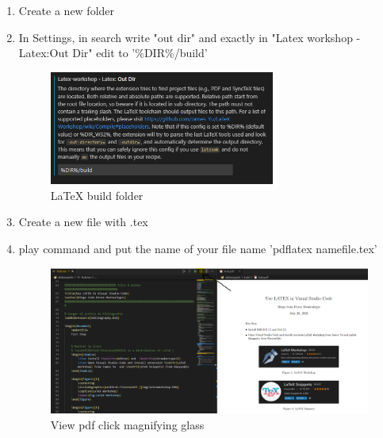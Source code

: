\documentclass{article}
\theoremstyle{mytheoremstyle}
\theoremstyle{mytheoremstyle}
\theoremstyle{myproblemstyle}
\begin{document}
    \begin{enumerate}
        \item Create a new folder
        \item In Settings, in search write "out dir"  and exactly in "Latex workshop - Latex:Out Dir" edit to '\%DIR\%/build'
        
        \begin{figure}[H]
            \centering
            \includegraphics[width=0.7\textwidth ]{img/dirworshop.PNG}
            \caption{LaTeX build folder}
            \label{fig:LaTeX build folder}
        \end{figure}

        
        
        \item Create a new file with .tex
        \item play command and put the name of your file name 'pdflatex namefile.tex'
        
        \begin{figure}[h]
            \centering
            \includegraphics[width=1\textwidth]{img/viewpdf.PNG}
            \caption{View pdf click magnifying glass}
            \label{fig:View pdf click magnifying glass}
        \end{figure}
    \end{enumerate}
    
\end{document}
